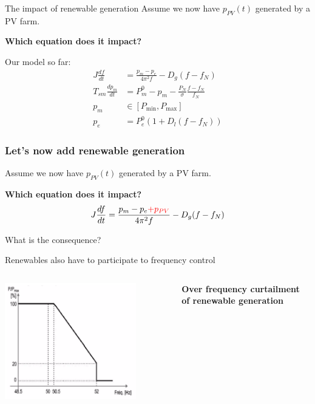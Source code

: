 \begin{frame}{The impact of renewable generation}
    Assume we now have $p_{PV}(t)$ generated by a PV farm.

    \textbf{Which equation does it impact?}

    Our model so far:
    \begin{align*}
    J \frac{df}{dt} &= \frac{p_m - p_e}{4\pi^2 f} - D_g (f-f_N)\\
    T_{sm} \frac{d p_m}{dt} &= P^0_m - p_m - \frac{P_{N}}{\sigma}\frac{f-f_N}{f_N}\\
    p_m &\in [P_{\min}, P_{\max}]\\
    p_e &= P_e^0 (1+D_l (f-f_N) )
    \end{align*}
\end{frame}

\begin{frame}
    \frametitle{Let's now add renewable generation}
    Assume we now have $p_{PV}(t)$ generated by a PV farm.

    \textbf{Which equation does it impact? }
    $$J \frac{df}{dt} = \frac{p_m - p_e \color{red}{+ p_{PV}}}{4\pi^2 f} - D_g (f-f_N)$$
    \begin{block}{What is the consequence?}
    \vspace*{1cm}
    \end{block}
\end{frame}

\begin{frame}{Renewables also have to participate to frequency control}
  \begin{columns}
  \begin{column}{0.55\textwidth}
    \begin{center}
      \includegraphics[width=0.8\textwidth]{images/diagramPf.PNG}
    \end{center}
    \end{column}
    \begin{column}{0.4\textwidth}
      \textbf{Over frequency curtailment of renewable generation}
      \end{column}
  \end{columns}
\end{frame}

